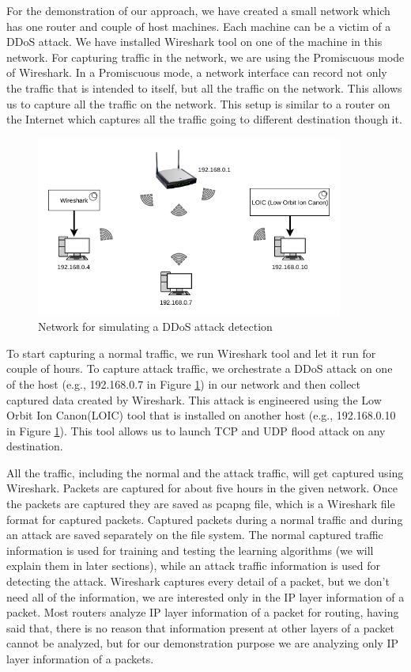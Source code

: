 \documentclass[12pt,oneside,a4paper]{article}
\begin{document}
For the demonstration of our approach, we have created a small network which has one router and couple of host machines. Each machine can be a victim of a DDoS attack. We have installed Wireshark tool on one of the machine in this network. For capturing traffic in the network, we are using the Promiscuous mode of Wireshark. In a Promiscuous mode, a network interface can record not only the traffic that is intended to itself, but all the traffic on the network. This allows us to capture all the traffic on the network. This setup is similar to a router on the Internet which captures all the traffic going to different destination though it.

\begin{figure}[H]
\centering
\includegraphics[width=0.90\textwidth]{demo_network.png}
\caption{Network for simulating a DDoS attack detection} \label{fig:demonetwork}
\end{figure}

To start capturing a normal traffic, we run Wireshark tool and let it run for couple of hours. To capture attack traffic, we orchestrate a DDoS attack on one of the host (e.g., 192.168.0.7 in Figure \ref{fig:demonetwork}) in our network and then collect captured data created by Wireshark. This attack is engineered using the Low Orbit Ion Canon(LOIC) tool that is installed on another host (e.g., 192.168.0.10 in Figure \ref{fig:demonetwork}). This tool allows us to launch TCP and UDP flood attack on any destination.

All the traffic, including the normal and the attack traffic, will get captured using Wireshark. Packets are captured for about five hours in the given network. Once the packets are captured they are saved as pcapng file, which is a Wireshark file format for captured packets. Captured packets during a normal traffic and during an attack are saved separately on the file system. The normal captured traffic information is used for training and testing the learning algorithms (we will explain them in later sections), while an attack traffic  information is used for detecting the attack. Wireshark captures every detail of a packet, but we don't need all of the information, we are interested only in the IP layer information of a packet. Most routers analyze IP layer information of a packet for routing, having said that, there is no reason that information present at other layers of a packet cannot be analyzed, but for our demonstration purpose we are analyzing only IP layer information of a packets.\par
\end{document}
